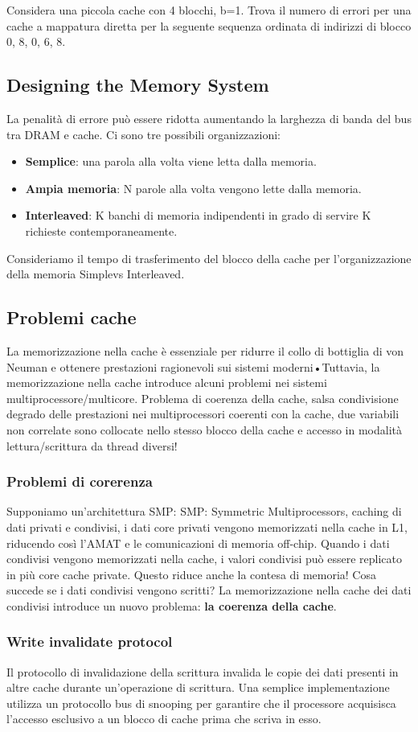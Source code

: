 \begin{example}
	Considera una piccola cache con 4 blocchi, b=1. Trova il numero di errori per una cache a mappatura diretta per la seguente sequenza ordinata di indirizzi di blocco 0, 8, 0, 6, 8.
\end{example}

\subsection{Designing the Memory System}
La penalità di errore può essere ridotta aumentando la larghezza di banda del bus tra DRAM e cache. Ci sono tre possibili organizzazioni:
\begin{itemize}
	\item \textbf{Semplice}: una parola alla volta viene letta dalla memoria.
	\item \textbf{Ampia memoria}: N parole alla volta vengono lette dalla memoria.
	\item \textbf{Interleaved}: K banchi di memoria indipendenti in grado di servire K richieste contemporaneamente.
\end{itemize}
Consideriamo il tempo di trasferimento del blocco della cache per l'organizzazione della memoria Simplevs Interleaved.

\subsection{Problemi cache}
La memorizzazione nella cache è essenziale per ridurre il collo di bottiglia di von Neuman e ottenere prestazioni ragionevoli sui sistemi moderni•Tuttavia, la memorizzazione nella cache introduce alcuni problemi nei sistemi multiprocessore/multicore. 
Problema di coerenza della cache, salsa condivisione degrado delle prestazioni nei multiprocessori coerenti con la cache, due variabili non correlate sono collocate nello stesso blocco della cache e accesso in modalità lettura/scrittura da thread diversi!

\subsubsection{Problemi di corerenza}
Supponiamo un'architettura SMP: SMP: Symmetric Multiprocessors, caching di dati privati e condivisi, i dati core privati vengono memorizzati nella cache in L1, riducendo così l'AMAT e le comunicazioni di memoria off-chip. 
Quando i dati condivisi vengono memorizzati nella cache, i valori condivisi può essere replicato in più core cache private. Questo riduce anche la contesa di memoria! Cosa succede se i dati condivisi vengono scritti? 
La memorizzazione nella cache dei dati condivisi introduce un nuovo problema: \textbf{la coerenza della cache}.

\subsubsection{Write invalidate protocol}
Il protocollo di invalidazione della scrittura invalida le copie dei dati presenti in altre cache durante un'operazione di scrittura. 
Una semplice implementazione utilizza un protocollo bus di snooping per garantire che il processore acquisisca l'accesso esclusivo a un blocco di cache prima che scriva in esso.
